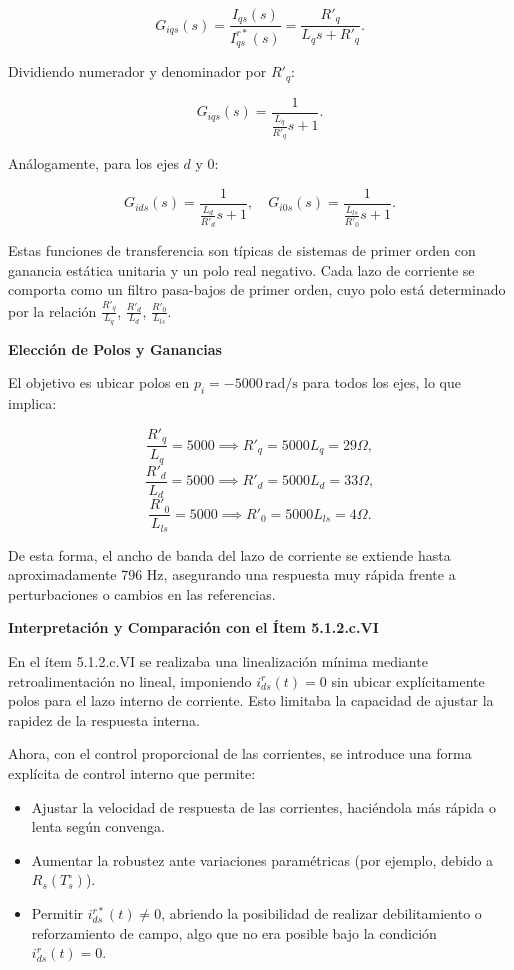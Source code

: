 \documentclass{article}
\begin{document}
\[
G_{iqs}(s) = \frac{I_{qs}(s)}{I_{qs}^{r*}(s)} = \frac{R'_q}{L_q s + R'_q}.
\]

Dividiendo numerador y denominador por \(R'_q\):

\[
G_{iqs}(s) = \frac{1}{\frac{L_q}{R'_q} s + 1}.
\]

Análogamente, para los ejes \(d\) y \(0\):

\[
G_{ids}(s) = \frac{1}{\frac{L_d}{R'_d} s + 1}, \quad G_{i0s}(s) = \frac{1}{\frac{L_{ls}}{R'_0} s + 1}.
\]

Estas funciones de transferencia son típicas de sistemas de primer orden con ganancia estática unitaria y un polo real negativo. Cada lazo de corriente se comporta como un filtro pasa-bajos de primer orden, cuyo polo está determinado por la relación \(\frac{R'_q}{L_q}\), \(\frac{R'_d}{L_d}\), \(\frac{R'_0}{L_{ls}}\).

\textbf{Elección de Polos y Ganancias}

El objetivo es ubicar polos en \(p_i = -5000\,\text{rad/s}\) para todos los ejes, lo que implica:

\[
\frac{R'_q}{L_q} = 5000 \implies R'_q = 5000 L_q = 29 \Omega,
\]
\[
\frac{R'_d}{L_d} = 5000 \implies R'_d = 5000 L_d = 33 \Omega,
\]
\[
\frac{R'_0}{L_{ls}} = 5000 \implies R'_0 = 5000 L_{ls} = 4 \Omega.
\]

De esta forma, el ancho de banda del lazo de corriente se extiende hasta aproximadamente 796 Hz, asegurando una respuesta muy rápida frente a perturbaciones o cambios en las referencias.

\textbf{Interpretación y Comparación con el Ítem 5.1.2.c.VI}

En el ítem 5.1.2.c.VI se realizaba una linealización mínima mediante retroalimentación no lineal, imponiendo \( i_{ds}^r(t)=0 \) sin ubicar explícitamente polos para el lazo interno de corriente. Esto limitaba la capacidad de ajustar la rapidez de la respuesta interna.

Ahora, con el control proporcional de las corrientes, se introduce una forma explícita de control interno que permite:

\begin{itemize}
    \item Ajustar la velocidad de respuesta de las corrientes, haciéndola más rápida o lenta según convenga.
    \item Aumentar la robustez ante variaciones paramétricas (por ejemplo, debido a \(R_s(T_s^\circ)\)).
    \item Permitir \( i_{ds}^{r*}(t) \neq 0 \), abriendo la posibilidad de realizar debilitamiento o reforzamiento de campo, algo que no era posible bajo la condición \(i_{ds}^r(t)=0\).
\end{itemize}
\end{document}
